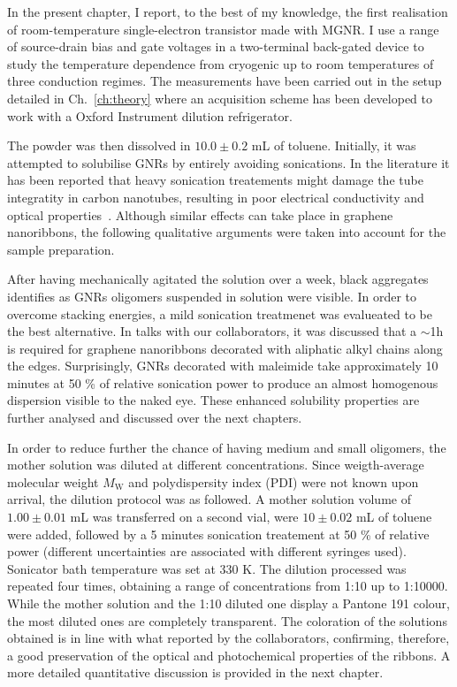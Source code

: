 In the present chapter, I report, to the best of my knowledge, the first realisation of room-temperature single-electron transistor made with \gls{MGNR}. I use a range of source-drain bias and gate voltages in a two-terminal back-gated device to study the temperature dependence from cryogenic up to room temperatures of three conduction regimes. The measurements have been carried out in the setup detailed in Ch.~\ref{ch:theory} where an acquisition scheme has been developed to work with a Oxford Instrument dilution refrigerator.


The powder was then dissolved in $10.0 \pm 0.2$ mL of toluene. Initially, it was attempted to solubilise \glspl{GNR} by entirely avoiding sonications. In the literature it has been reported that heavy sonication treatements might damage the tube integratity in carbon nanotubes, resulting in poor electrical conductivity and optical properties~\cite{park2002dispersion, huang2012dispersion, rossell2013impact}. Although similar effects can take place in graphene nanoribbons, the following qualitative arguments were taken into account for the sample preparation.

After having mechanically agitated the solution over a week, black aggregates identifies as \glspl{GNR} oligomers suspended in solution were visible. In order to overcome stacking energies, a mild sonication treatmenet was evalueated to be the best alternative. In talks with our collaborators, it was discussed that a $\sim$1h is required for graphene nanoribbons decorated with aliphatic alkyl chains along the edges. Surprisingly, \glspl{GNR} decorated with maleimide take approximately 10 minutes at 50 \% of relative sonication power to produce an almost homogenous dispersion visible to the naked eye. These enhanced solubility properties are further analysed and discussed over the next chapters.

In order to reduce further the chance of having medium and small oligomers, the mother solution was diluted at different concentrations. Since weigth-average molecular weight $M_\textrm{W}$ and polydispersity index (PDI) were not known upon arrival, the dilution protocol was as followed. A mother solution volume of $1.00 \pm 0.01$ mL was transferred on a second vial, were $10 \pm 0.02$ mL of toluene were added, followed by a 5 minutes sonication treatement at 50 \% of relative power (different uncertainties are associated with different syringes used). Sonicator bath temperature was set at 330 K. The dilution processed was repeated four times, obtaining a range of concentrations from 1:10 up to 1:10000. While the mother solution and the 1:10 diluted one display a Pantone 191 colour, the most diluted ones are completely transparent. The coloration of the solutions obtained is in line with what reported by the collaborators, confirming, therefore, a good preservation of the optical and photochemical properties of the ribbons.
A more detailed quantitative discussion is provided in the next chapter.

